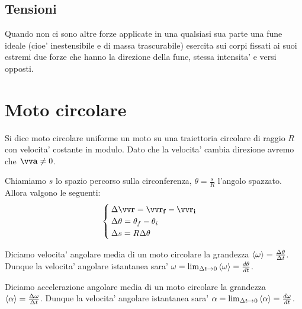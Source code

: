 \subsection{Tensioni}

Quando non ci sono altre forze applicate in una qualsiasi sua parte una fune ideale (cioe' inestensibile e di massa trascurabile) esercita sui corpi fissati ai suoi estremi due forze che hanno la direzione della fune, stessa intensita' e versi opposti.

\section{Moto circolare}

Si dice moto circolare uniforme un moto su una traiettoria circolare di raggio $R$ con velocita' costante in modulo. Dato che la velocita' cambia direzione avremo che $\bvv a \neq 0$.

Chiamiamo $s$ lo spazio percorso sulla circonferenza, $\theta = \frac{s}{R}$ l'angolo spazzato. Allora valgono le seguenti: \[
    \begin{cases}
        \Delta \bvv r = \bvv{r_f} - \bvv{r_i}\\
        \Delta \theta= \theta_f - \theta_i\\
        \Delta s = R\Delta \theta
    \end{cases}    
\]

\begin{definition}
    Diciamo velocita' angolare media di un moto circolare la grandezza $\left\langle\omega\right\rangle = \frac{\Delta \theta}{\Delta t}$. Dunque la velocita' angolare istantanea sara' $\omega = \lim_{\Delta t \to 0} \left\langle\omega\right\rangle = \frac{d\theta}{dt}$.
\end{definition}

\begin{definition}
    Diciamo accelerazione angolare media di un moto circolare la grandezza $\left\langle\alpha\right\rangle = \frac{\Delta \omega}{\Delta t}$. Dunque la velocita' angolare istantanea sara' $\alpha = \lim_{\Delta t \to 0} \left\langle\alpha\right\rangle = \frac{d\omega}{dt}$.
\end{definition}